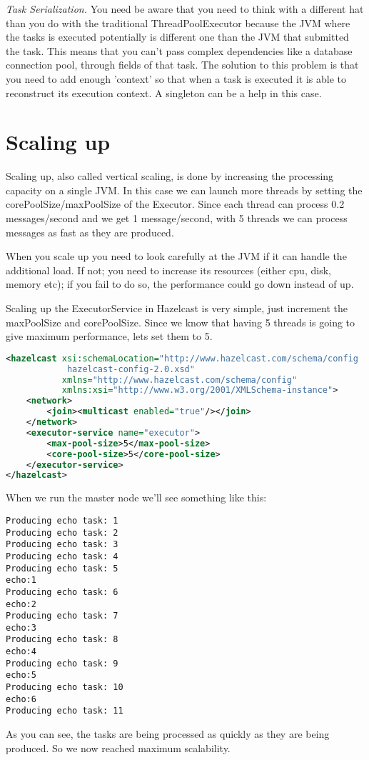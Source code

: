 \emph{Task Serialization.} You need be aware that you need to think with a different hat than you do with the traditional ThreadPoolExecutor because the JVM where the tasks is executed potentially is different one than the JVM that submitted the task. This means that you can't pass complex dependencies like a database connection pool, through fields of that task. The solution to this problem is that you need to add enough 'context' so that when a task is executed it is able to reconstruct its execution context. A singleton can be a help in this case.

\section{Scaling up}
Scaling up, also called vertical scaling, is done by increasing the processing capacity on a single JVM. In this case we can launch more threads by setting the corePoolSize/maxPoolSize of the Executor. Since each thread can process 0.2 messages/second and we get 1 message/second, with 5 threads we can process messages as fast as they are produced.

When you scale up you need to look carefully at the JVM if it can handle the additional load. If not; you need to increase its resources (either cpu, disk, memory etc); if you fail to do so, the performance could go down instead of up. 

Scaling up the ExecutorService in Hazelcast is very simple, just increment the maxPoolSize and corePoolSize. Since we know that having 5 threads is going to give maximum performance, lets set them to 5.
\begin{lstlisting}[language=xml]
<hazelcast xsi:schemaLocation="http://www.hazelcast.com/schema/config
            hazelcast-config-2.0.xsd"
           xmlns="http://www.hazelcast.com/schema/config"
           xmlns:xsi="http://www.w3.org/2001/XMLSchema-instance">
    <network>
        <join><multicast enabled="true"/></join>
    </network>
    <executor-service name="executor">
        <max-pool-size>5</max-pool-size>
        <core-pool-size>5</core-pool-size>
    </executor-service>
</hazelcast>
\end{lstlisting}
When we run the master node we'll see something like this:
\begin{lstlisting}
Producing echo task: 1
Producing echo task: 2
Producing echo task: 3
Producing echo task: 4
Producing echo task: 5
echo:1
Producing echo task: 6
echo:2
Producing echo task: 7
echo:3
Producing echo task: 8
echo:4
Producing echo task: 9
echo:5
Producing echo task: 10
echo:6
Producing echo task: 11	
\end{lstlisting}
As you can see, the tasks are being processed as quickly as they are being produced. So we now reached maximum scalability.

